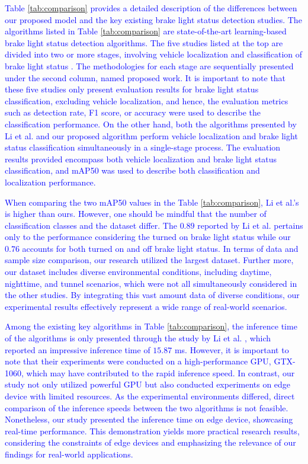 \textcolor{blue}{
Table \ref{tab:comparison} provides a detailed description of the differences between our proposed model and the key existing brake light status detection studies.
The algorithms listed in Table \ref{tab:comparison} are state-of-the-art learning-based brake light status detection algorithms. 
The five studies listed at the top are divided into two or more stages, involving vehicle localization and classification of brake light status \cite{cui2015vision,nava2019collision,pirhonen2022brake,wang2016appearance,kim2022detecting}.
The methodologies for each stage are sequentially presented under the second column, named proposed work.
It is important to note that these five studies only present evaluation results for brake light status classification, excluding vehicle localization, and hence, the evaluation metrics such as detection rate, F1 score, or accuracy were used to describe the classification performance.
On the other hand, both the algorithms presented by Li et al. \cite{li2020highly} and our proposed algorithm perform vehicle localization and brake light status classification simultaneously in a single-stage process.
The evaluation results provided encompass both vehicle localization and brake light status classification, and mAP50 was used to describe both classification and localization performance.
}

\textcolor{blue}{
When comparing the two mAP50 values in the Table \ref{tab:comparison}, Li et al.'s is higher than ours. However, one should be mindful that the number of classification classes and the dataset differ.
The $0.89$ reported by Li et al. \cite{li2020highly} pertains only to the performance considering the turned on brake light status while our $0.76$ accounts for both turned on and off brake light status.
In terms of data and sample size comparison, our research utilized the largest dataset. 
Further more, our dataset includes diverse environmental conditions, including daytime, nighttime, and tunnel scenarios, which were not all simultaneously considered in the other studies.
By integrating this vast amount data of diverse conditions, our experimental results effectively represent a wide range of real-world scenarios.
}

\textcolor{blue}{
Among the existing key algorithms in Table \ref{tab:comparison}, the inference time of the algorithms is only presented through the study by Li et al. \cite{li2020highly}, which reported an impressive inference time of $15.87$ ms.
However, it is important to note that their experiments were conducted on a high-performance GPU, GTX-1060, which may have contributed to the rapid inference speed.
In contrast, our study not only utilized powerful GPU but also conducted experiments on edge device with limited resources.
As the experimental environments differed, direct comparison of the inference speeds between the two algorithms is not feasible.
Nonetheless, our study presented the inference time on edge device, showcasing real-time performance. This demonstration yields more practical research results, considering the constraints of edge devices and emphasizing the relevance of our findings for real-world applications.
}